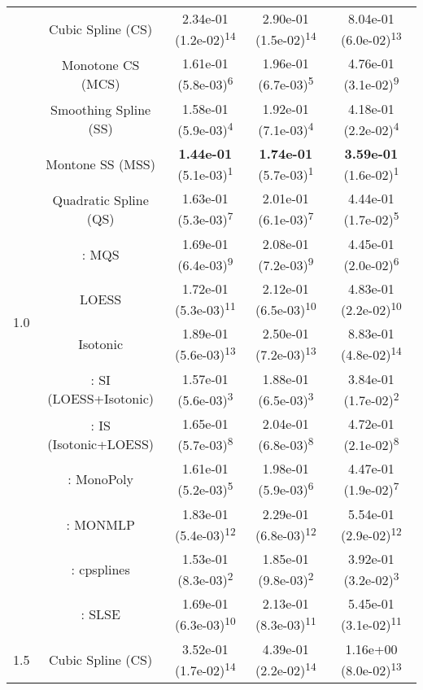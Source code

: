 \begin{tabular}{ccccc}
\midrule
\multirow{14}{*}{1.0}&Cubic Spline (CS)& 2.34e-01 (1.2e-02)\textsuperscript{14}& 2.90e-01 (1.5e-02)\textsuperscript{14}& 8.04e-01 (6.0e-02)\textsuperscript{13}\tabularnewline
&Monotone CS (MCS)& 1.61e-01 (5.8e-03)\textsuperscript{6}& 1.96e-01 (6.7e-03)\textsuperscript{5}& 4.76e-01 (3.1e-02)\textsuperscript{9}\tabularnewline
&Smoothing Spline (SS)& 1.58e-01 (5.9e-03)\textsuperscript{4}& 1.92e-01 (7.1e-03)\textsuperscript{4}& 4.18e-01 (2.2e-02)\textsuperscript{4}\tabularnewline
&Montone SS (MSS)& \textbf{1.44e-01} (5.1e-03)\textsuperscript{1}& \textbf{1.74e-01} (5.7e-03)\textsuperscript{1}& \textbf{3.59e-01} (1.6e-02)\textsuperscript{1}\tabularnewline
&Quadratic Spline (QS)& 1.63e-01 (5.3e-03)\textsuperscript{7}& 2.01e-01 (6.1e-03)\textsuperscript{7}& 4.44e-01 (1.7e-02)\textsuperscript{5}\tabularnewline
&\textcite{heMonotoneBsplineSmoothing1998}: MQS& 1.69e-01 (6.4e-03)\textsuperscript{9}& 2.08e-01 (7.2e-03)\textsuperscript{9}& 4.45e-01 (2.0e-02)\textsuperscript{6}\tabularnewline
&LOESS& 1.72e-01 (5.3e-03)\textsuperscript{11}& 2.12e-01 (6.5e-03)\textsuperscript{10}& 4.83e-01 (2.2e-02)\textsuperscript{10}\tabularnewline
&Isotonic& 1.89e-01 (5.6e-03)\textsuperscript{13}& 2.50e-01 (7.2e-03)\textsuperscript{13}& 8.83e-01 (4.8e-02)\textsuperscript{14}\tabularnewline
&\textcite{mammenEstimatingSmoothMonotone1991}: SI (LOESS+Isotonic)& 1.57e-01 (5.6e-03)\textsuperscript{3}& 1.88e-01 (6.5e-03)\textsuperscript{3}& 3.84e-01 (1.7e-02)\textsuperscript{2}\tabularnewline
&\textcite{mammenEstimatingSmoothMonotone1991}: IS (Isotonic+LOESS)& 1.65e-01 (5.7e-03)\textsuperscript{8}& 2.04e-01 (6.8e-03)\textsuperscript{8}& 4.72e-01 (2.1e-02)\textsuperscript{8}\tabularnewline
&\textcite{murrayFastFlexibleMethods2016a}: MonoPoly& 1.61e-01 (5.2e-03)\textsuperscript{5}& 1.98e-01 (5.9e-03)\textsuperscript{6}& 4.47e-01 (1.9e-02)\textsuperscript{7}\tabularnewline
&\textcite{cannonMonmlpMultilayerPerceptron2017}: MONMLP& 1.83e-01 (5.4e-03)\textsuperscript{12}& 2.29e-01 (6.8e-03)\textsuperscript{12}& 5.54e-01 (2.9e-02)\textsuperscript{12}\tabularnewline
&\textcite{navarro-garciaConstrainedSmoothingOutofrange2023}: cpsplines& 1.53e-01 (8.3e-03)\textsuperscript{2}& 1.85e-01 (9.8e-03)\textsuperscript{2}& 3.92e-01 (3.2e-02)\textsuperscript{3}\tabularnewline
&\textcite{groeneboomConfidenceIntervalsMonotone2023}: SLSE& 1.69e-01 (6.3e-03)\textsuperscript{10}& 2.13e-01 (8.3e-03)\textsuperscript{11}& 5.45e-01 (3.1e-02)\textsuperscript{11}\tabularnewline
\midrule
\multirow{14}{*}{1.5}&Cubic Spline (CS)& 3.52e-01 (1.7e-02)\textsuperscript{14}& 4.39e-01 (2.2e-02)\textsuperscript{14}& 1.16e+00 (8.0e-02)\textsuperscript{13}\tabularnewline

\end{tabular}
